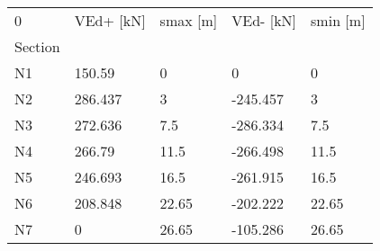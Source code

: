 \begin{tabular}{lllll}
\toprule
0 & VEd+ [kN] & smax [m] & VEd- [kN] & smin [m] \\
Section &           &          &           &          \\
\midrule
N1      &    150.59 &        0 &         0 &        0 \\
N2      &   286.437 &        3 &  -245.457 &        3 \\
N3      &   272.636 &      7.5 &  -286.334 &      7.5 \\
N4      &    266.79 &     11.5 &  -266.498 &     11.5 \\
N5      &   246.693 &     16.5 &  -261.915 &     16.5 \\
N6      &   208.848 &    22.65 &  -202.222 &    22.65 \\
N7      &         0 &    26.65 &  -105.286 &    26.65 \\
\bottomrule
\end{tabular}
